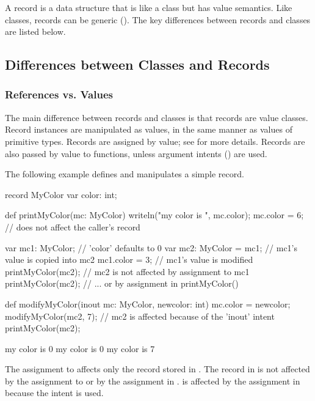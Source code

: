 \label{Records}

A record is a data structure that is like a class but has value
semantics.  Like classes, records can be generic ().
The key differences between records and classes are listed below.

\subsection{Differences between Classes and Records}
\label{Class_and_Record_Differences}

\subsubsection{References vs. Values}
\label{Records_as_Value_Classes}

The main difference between records and classes is that records are
value classes.  Record instances are manipulated as values, in the
same manner as values of primitive types.  Records are assigned by value;
see  for more details.  Records are also passed
by value to functions, unless argument intents () are used.

\begin{example}
The following example defines and manipulates a simple record.
\begin{chapelpre}
\end{chapelpre}
\begin{chapel}
record MyColor {
  var color: int;
}

def printMyColor(mc: MyColor) {
  writeln("my color is ", mc.color);
  mc.color = 6;   // does not affect the caller's record
}

var mc1: MyColor;        // 'color' defaults to 0
var mc2: MyColor = mc1;  // mc1's value is copied into mc2
mc1.color = 3;           // mc1's value is modified
printMyColor(mc2);       // mc2 is not affected by assignment to mc1
printMyColor(mc2);       // ... or by assignment in printMyColor()

def modifyMyColor(inout mc: MyColor, newcolor: int) {
  mc.color = newcolor;
}
modifyMyColor(mc2, 7);   // mc2 is affected because of the 'inout' intent
printMyColor(mc2);
\end{chapel}
\begin{chapeloutput}
my color is 0
my color is 0
my color is 7
\end{chapeloutput}
The assignment to  affects only the record stored
in . The record in  is not affected by
the assignment to  or by the assignment in .
 is affected by the assignment in 
because the intent  is used.
\end{example}

